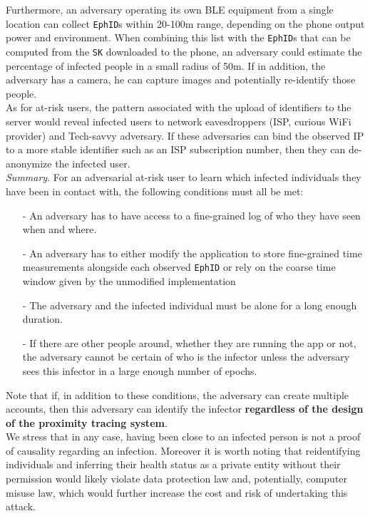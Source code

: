 \documentclass[12pt,a4paper]{article}
\begin{document}
Furthermore, an adversary operating its own BLE equipment from a single location can
collect \texttt{EphID}s within 20-100m range, depending on the phone output power and
environment. When combining this list with the \texttt{EphID}s that can be computed from the \texttt{SK} downloaded to the phone, an adversary could estimate the percentage of infected people in a small radius of 50m. If in addition, the adversary has a camera, he can capture images and potentially re-identify those people.\\[0.3cm]
As for at-risk users, the pattern associated with the upload of identifiers to the server would reveal infected users to network eavesdroppers (ISP, curious WiFi provider) and Tech-savvy adversary. If these adversaries can bind the observed IP to a more stable identifier such as an ISP subscription number, then they can de-anonymize the infected user.\\[0.6cm]
\textit{Summary}. For an adversarial at-risk user to learn which infected individuals they have been in contact with, the following conditions must all be met:
\begin{itemize}\itemsep0pt
\item[-] An adversary has to have access to a fine-grained log of who they have seen when
and where.
\item[-] An adversary has to either modify the application to store fine-grained time
measurements alongside each observed \texttt{EphID} or rely on the coarse time window
given by the unmodified implementation 
\item[-] The adversary and the infected individual must be alone for a long enough duration.
\item[-] If there are other people around, whether they are running the app or not, the
adversary cannot be certain of who is the infector unless the adversary sees this
infector in a large enough number of epochs.
\end{itemize}
Note that if, in addition to these conditions, the adversary can create multiple accounts, then this adversary can identify the infector \textbf{regardless of the design of the proximity tracing system}.\\[0.3cm]
We stress that in any case, having been close to an infected person is not a proof of
causality regarding an infection. Moreover it is worth noting that reidentifying individuals and inferring their health status as a private entity without their permission would likely violate data protection law and, potentially, computer misuse law, which would further increase the cost and risk of undertaking this attack.\\[0.3cm]
\end{document}
